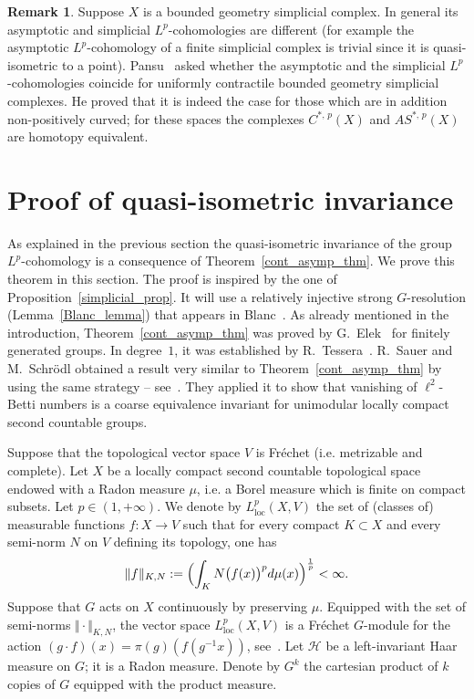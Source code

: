 \documentclass[11pt]{article}
\theoremstyle{definition}
\newtheorem{rema}[theo]{Remark}
\numberwithin{equation}{section}
\numberwithin{figure}{section}
\numberwithin{table}{section}
\DeclareMathOperator{\loc}{loc}
\begin{document}
\begin{rema}
Suppose $X$ is a bounded geometry simplicial complex. In general its asymptotic and simplicial
$L^p$-cohomologies are different (for example the asymptotic $L^p$-cohomology of a finite simplicial complex is trivial since it is quasi-isometric to a point). Pansu~\cite{Pa95} asked whether the asymptotic and the simplicial $L^p$-cohomologies coincide for uniformly contractile bounded geometry simplicial complexes. He proved that it is indeed the case for those which are in addition non-positively curved; for these spaces the complexes $C^{*,\,p}(X)$ and $AS^{*,\,p}(X)$ are homotopy equivalent.
\end{rema}


\section{Proof of quasi-isometric invariance}\label{4}

As explained in the previous section the quasi-isometric invariance of the group $L^p$-cohomology is a consequence of Theorem~\ref{cont_asymp_thm}. We prove this theorem in this section. The proof is inspired by the one of Proposition~\ref{simplicial_prop}. It will use a relatively injective strong $G$-resolution (Lemma~\ref{Blanc_lemma}) that appears in Blanc~\cite{Bl}. As already mentioned in the introduction, Theorem~\ref{cont_asymp_thm} was proved by G.~Elek~\cite{Elek} for finitely generated groups. In degree~$1$, it was established by R.~Tessera~\cite{T}. R.~Sauer and M.~Schr\"odl obtained a result very similar to Theorem~\ref{cont_asymp_thm} by using the same strategy -- see~\cite[Theorem~10]{SaSc}. They applied it to show that vanishing of $\ell^2$-Betti numbers is a coarse equivalence invariant for unimodular locally compact second countable groups.


Suppose that the topological vector space $V$ is Fréchet (i.e. metrizable and complete). Let $X$ be a locally compact second countable topological space endowed with a Radon measure $\mu$, i.e. a Borel measure which is finite on compact subsets. Let $p \in (1, +\infty)$. We denote by $L_{\loc}^p(X,V)$ the set of (classes of) measurable functions $f: X \to V$ such that for every compact $K \subset X$ and every semi-norm $N$ on $V$ defining its topology, one has
\[
\Vert f \Vert _{K,N}:= \Bigl(\int _K N\bigl(f(x)\bigr) ^p d\mu (x) \Bigr)^{\frac{1}{p}} < \infty.
\]
Suppose that $G$ acts on $X$ continuously by preserving $\mu$. Equipped with the set of semi-norms $\Vert \cdot \Vert_{K,N}$, the vector space $L_{\loc}^p(X,V)$ is a Fréchet $G$-module for the action $(g \cdot f) (x) = \pi (g) (f(g^{-1} x))$, see~\cite{Bl}. Let $\mathcal H$ be a left-invariant Haar measure on $G$; it is a Radon measure. Denote by $G^k$ the cartesian product of $k$ copies of $G$ equipped with the product measure.
\end{document}
